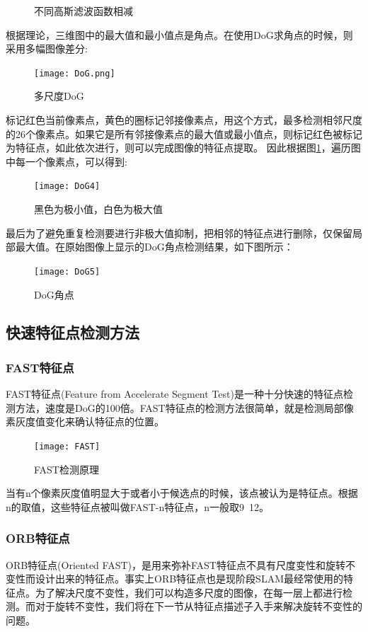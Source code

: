 \begin{figure}[H]
\begin{subfigure}[ht]{0.3\textwidth}
	\end{subfigure}
	\caption{不同高斯滤波函数相减}\label{differentsigma}
\end{figure}
根据理论，三维图中的最大值和最小值点是角点。在使用DoG求角点的时候，则采用多幅图像差分:\par
\begin{figure}[H]
	\centering
	\texttt{[image: DoG.png]}
	\caption{多尺度DoG}
\end{figure}\par
标记红色当前像素点，黄色的圈标记邻接像素点，用这个方式，最多检测相邻尺度的26个像素点。如果它是所有邻接像素点的最大值或最小值点，则标记红色被标记为特征点，如此依次进行，则可以完成图像的特征点提取。
因此根据图\ref{differentsigma}，遍历图中每一个像素点，可以得到:
\begin{figure}[H]
	\centering
	\texttt{[image: DoG4]}
	\caption{黑色为极小值，白色为极大值}
\end{figure}\par
最后为了避免重复检测要进行非极大值抑制，把相邻的特征点进行删除，仅保留局部最大值。在原始图像上显示的DoG角点检测结果，如下图所示：
\begin{figure}
	\centering
	\texttt{[image: DoG5]}
	\caption{DoG角点}
\end{figure}
\subsection{快速特征点检测方法}
\subsubsection{FAST特征点}
FAST特征点(Feature from Accelerate Segment Test)\cite{rosten2005fusing}是一种十分快速的特征点检测方法，速度是DoG的100倍。FAST特征点的检测方法很简单，就是检测局部像素灰度值变化来确认特征点的位置。\par
\begin{figure}[H]
	\centering
	\texttt{[image: FAST]}
	\caption{FAST检测原理}
\end{figure}
当有n个像素灰度值明显大于或者小于候选点的时候，该点被认为是特征点。根据n的取值，这些特征点被叫做FAST-n特征点，n一般取9~12。
\subsubsection{ORB特征点}
ORB特征点(Oriented FAST)，是用来弥补FAST特征点不具有尺度变性和旋转不变性而设计出来的特征点。事实上ORB特征点也是现阶段SLAM最经常使用的特征点。为了解决尺度不变性，我们可以构造多尺度的图像，在每一层上都进行检测。而对于旋转不变性，我们将在下一节从特征点描述子入手来解决旋转不变性的问题。

